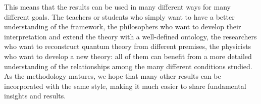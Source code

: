 \documentclass[entropy,article,submit,moreauthors]{Definitions/mdpi}
\begin{document}
This means that the results can be used in many different ways for many different goals. The teachers or students who simply want to have a better understanding of the framework, the philosophers who want to develop their interpretation and extend the theory with a well-defined ontology, the researchers who want to reconstruct quantum theory from different premises, the physicists who want to develop a new theory: all of them can benefit from a more detailed understanding of the relationships among the many different conditions studied. As the methodology matures, we hope that many other results can be incorporated with the same style, making it much easier to share fundamental insights and results.






\end{document}
